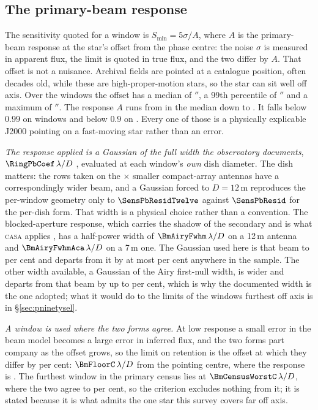 \subsection{The primary-beam response}
\label{app:pbresp}

The sensitivity quoted for a window is $S_{\min}=5\sigma/A$, where $A$ is the
primary-beam response at the star's offset from the phase centre: the noise
$\sigma$ is measured in apparent flux, the limit is quoted in true flux, and
the two differ by $A$. That offset is not a nuisance. Archival fields are
pointed at a catalogue position, often decades old, while these are
high-proper-motion stars, so the star can sit well off axis. Over the
\PbNWin{} windows the offset has a median of \PbOffMed$''$, a 99th
percentile of \PbOffPNN$''$ and a maximum of \BmOffMax$''$. The response $A$
runs from \BmRespMed{} in the median down to \BmRespMin. It falls below $0.99$
on \PbNLowNN{} windows and below $0.9$ on \BmNBelowNine. Every one
of those is a physically explicable J2000 pointing on a
fast-moving star rather than an error.

\emph{The response applied is a Gaussian of the full width the observatory
documents}, $\RingPbCoef\,\lambda/D$ \citep{ALMAHandbook}, evaluated at each
window's \emph{own} dish diameter. The dish matters: the \PbNAcaRow{} rows
taken on the \PbAcaRatio$\times$ smaller compact-array antennas have a
correspondingly wider beam, and a Gaussian forced to $D=12$\,m reproduces the
per-window geometry only to $\SensPbResidTwelve$ against $\SensPbResid$ for
the per-dish form. That width is a physical choice rather than a convention.
The blocked-aperture response, which carries the shadow of the secondary and
is what \textsc{casa} applies \citep{CASA2022}, has a half-power
width of $\BmAiryFwhm\,\lambda/D$ on a 12\,m antenna and
$\BmAiryFwhmAca\,\lambda/D$ on a 7\,m one. The Gaussian used here is that
beam to \BmDocAiryPct{} per cent and departs from it by at most
\BmModelMaxPct{} per cent anywhere in the sample. The other width available,
a Gaussian of the Airy first-null width, is wider and departs from that beam
by up to \BmModelMaxNullPct{} per cent, which is why the documented width is
the one adopted; what it would do to the limits of the windows furthest off
axis is in \S\ref{sec:pninetysel}.

\emph{A window is used where the two forms agree.} At low response a small
error in the beam model becomes a large error in inferred flux, and the two
forms part company as the offset grows, so the limit on retention is the
offset at which they differ by \BmFloorTolPct{} per cent:
$\BmFloorC\,\lambda/D$ from the pointing centre, where the response is
\BmFloorResp. The furthest window in the primary census lies at
$\BmCensusWorstC\,\lambda/D$, where the two agree to \BmCensusWorstPct{} per
cent, so the criterion excludes nothing from it; it is stated because it is
what admits the one star this survey covers far off axis.

